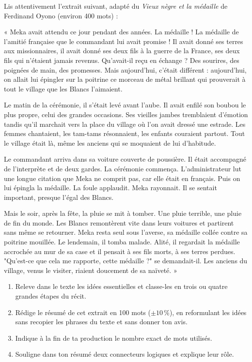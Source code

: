 \documentclass[11pt]{article}
\newcounter{popsec}
\newcounter{popsub}
\newcommand{\courssub}[1]{%
  \stepcounter{popsub}%
  \par\vspace{9pt}\noindent{\popxbold\fontsize{11.5}{13}\selectfont\color{popink}{\color{poporange}\thepopsec.\thepopsub}\hspace{6pt}#1}\par\nopagebreak\vspace{4pt}
}
\begin{document}
\courssub{Je me prépare au Bac}

\begin{exercice}
Lis attentivement l'extrait suivant, adapté du \emph{Vieux nègre et la médaille} de Ferdinand Oyono (environ 400 mots) :

« Meka avait attendu ce jour pendant des années. La médaille ! La médaille de l'amitié française que le commandant lui avait promise ! Il avait donné ses terres aux missionnaires, il avait donné ses deux fils à la guerre de la France, ses deux fils qui n'étaient jamais revenus. Qu'avait-il reçu en échange ? Des sourires, des poignées de main, des promesses. Mais aujourd'hui, c'était différent : aujourd'hui, on allait lui épingler sur la poitrine ce morceau de métal brillant qui prouverait à tout le village que les Blancs l'aimaient.

Le matin de la cérémonie, il s'était levé avant l'aube. Il avait enfilé son boubou le plus propre, celui des grandes occasions. Ses vieilles jambes tremblaient d'émotion tandis qu'il marchait vers la place du village où l'on avait dressé une estrade. Les femmes chantaient, les tam-tams résonnaient, les enfants couraient partout. Tout le village était là, même les anciens qui se moquaient de lui d'habitude.

Le commandant arriva dans sa voiture couverte de poussière. Il était accompagné de l'interprète et de deux gardes. La cérémonie commença. L'administrateur lut une longue citation que Meka ne comprit pas, car elle était en français. Puis on lui épingla la médaille. La foule applaudit. Meka rayonnait. Il se sentait important, presque l'égal des Blancs.

Mais le soir, après la fête, la pluie se mit à tomber. Une pluie terrible, une pluie de fin du monde. Les Blancs remontèrent vite dans leurs voitures et partirent sans même se retourner. Meka resta seul sous l'averse, sa médaille collée contre sa poitrine mouillée. Le lendemain, il tomba malade. Alité, il regardait la médaille accrochée au mur de sa case et il pensait à ses fils morts, à ses terres perdues. "Qu'est-ce que cela me rapporte, cette médaille ?" se demandait-il. Les anciens du village, venus le visiter, riaient doucement de sa naïveté. »

\begin{enumerate}
\item Releve dans le texte les idées essentielles et classe-les en trois ou quatre grandes étapes du récit.
\item Rédige le résumé de cet extrait en 100 mots ($\pm 10\,\%$), en reformulant les idées sans recopier les phrases du texte et sans donner ton avis.
\item Indique à la fin de ta production le nombre exact de mots utilisés.
\item Souligne dans ton résumé deux connecteurs logiques et explique leur rôle.
\end{enumerate}
\end{exercice}
\end{document}
